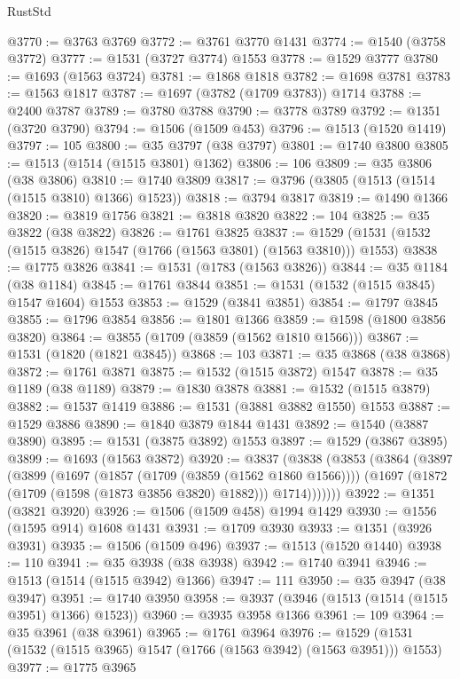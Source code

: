 \begin{lexlean}{RustStd}
\begin{coremodule}
@3770 := @3763 @3769
@3772 := @3761 @3770 @1431
@3774 := @1540 (@3758 @3772)
@3777 := @1531 (@3727 @3774) @1553
@3778 := @1529 @3777
@3780 := @1693 (@1563 @3724)
@3781 := @1868 @1818
@3782 := @1698 @3781
@3783 := @1563 @1817
@3787 := @1697 (@3782 (@1709 @3783)) @1714
@3788 := @2400 @3787
@3789 := @3780 @3788
@3790 := @3778 @3789
@3792 := @1351 (@3720 @3790)
@3794 := @1506 (@1509 @453)
@3796 := @1513 (@1520 @1419)
@3797 := 105
@3800 := @35 @3797 (@38 @3797)
@3801 := @1740 @3800
@3805 := @1513 (@1514 (@1515 @3801) @1362)
@3806 := 106
@3809 := @35 @3806 (@38 @3806)
@3810 := @1740 @3809
@3817 := @3796 (@3805 (@1513 (@1514 (@1515 @3810) @1366) @1523))
@3818 := @3794 @3817
@3819 := @1490 @1366
@3820 := @3819 @1756
@3821 := @3818 @3820
@3822 := 104
@3825 := @35 @3822 (@38 @3822)
@3826 := @1761 @3825
@3837 := @1529 (@1531 (@1532 (@1515 @3826) @1547 (@1766 (@1563 @3801) (@1563 @3810))) @1553)
@3838 := @1775 @3826
@3841 := @1531 (@1783 (@1563 @3826))
@3844 := @35 @1184 (@38 @1184)
@3845 := @1761 @3844
@3851 := @1531 (@1532 (@1515 @3845) @1547 @1604) @1553
@3853 := @1529 (@3841 @3851)
@3854 := @1797 @3845
@3855 := @1796 @3854
@3856 := @1801 @1366
@3859 := @1598 (@1800 @3856 @3820)
@3864 := @3855 (@1709 (@3859 (@1562 @1810 @1566)))
@3867 := @1531 (@1820 (@1821 @3845))
@3868 := 103
@3871 := @35 @3868 (@38 @3868)
@3872 := @1761 @3871
@3875 := @1532 (@1515 @3872) @1547
@3878 := @35 @1189 (@38 @1189)
@3879 := @1830 @3878
@3881 := @1532 (@1515 @3879)
@3882 := @1537 @1419
@3886 := @1531 (@3881 @3882 @1550) @1553
@3887 := @1529 @3886
@3890 := @1840 @3879 @1844 @1431
@3892 := @1540 (@3887 @3890)
@3895 := @1531 (@3875 @3892) @1553
@3897 := @1529 (@3867 @3895)
@3899 := @1693 (@1563 @3872)
@3920 := @3837
    (@3838
      (@3853
        (@3864
          (@3897
            (@3899
              (@1697
                (@1857 (@1709 (@3859 (@1562 @1860 @1566))))
                (@1697 (@1872 (@1709 (@1598 (@1873 @3856 @3820) @1882))) @1714)))))))
@3922 := @1351 (@3821 @3920)
@3926 := @1506 (@1509 @458) @1994 @1429
@3930 := @1556 (@1595 @914) @1608 @1431
@3931 := @1709 @3930
@3933 := @1351 (@3926 @3931)
@3935 := @1506 (@1509 @496)
@3937 := @1513 (@1520 @1440)
@3938 := 110
@3941 := @35 @3938 (@38 @3938)
@3942 := @1740 @3941
@3946 := @1513 (@1514 (@1515 @3942) @1366)
@3947 := 111
@3950 := @35 @3947 (@38 @3947)
@3951 := @1740 @3950
@3958 := @3937 (@3946 (@1513 (@1514 (@1515 @3951) @1366) @1523))
@3960 := @3935 @3958 @1366
@3961 := 109
@3964 := @35 @3961 (@38 @3961)
@3965 := @1761 @3964
@3976 := @1529 (@1531 (@1532 (@1515 @3965) @1547 (@1766 (@1563 @3942) (@1563 @3951))) @1553)
@3977 := @1775 @3965

\end{coremodule}
\end{lexlean}
